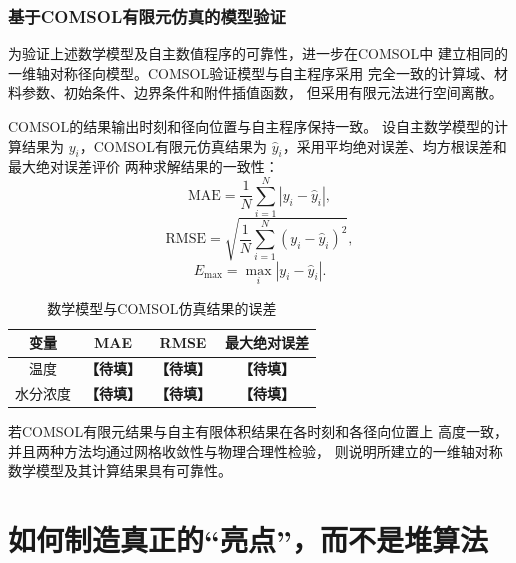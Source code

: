 \documentclass[12pt,a4paper]{article}
\begin{document}
\subsubsection{基于COMSOL有限元仿真的模型验证}

为验证上述数学模型及自主数值程序的可靠性，进一步在COMSOL中
建立相同的一维轴对称径向模型。COMSOL验证模型与自主程序采用
完全一致的计算域、材料参数、初始条件、边界条件和附件插值函数，
但采用有限元法进行空间离散。

COMSOL的结果输出时刻和径向位置与自主程序保持一致。
设自主数学模型的计算结果为 $y_i$，COMSOL有限元仿真结果为
$\hat y_i$，采用平均绝对误差、均方根误差和最大绝对误差评价
两种求解结果的一致性：
\begin{equation}
\mathrm{MAE}
=
\frac{1}{N}
\sum_{i=1}^{N}
\left|y_i-\hat y_i\right|,
\end{equation}
\begin{equation}
\mathrm{RMSE}
=
\sqrt{
\frac{1}{N}
\sum_{i=1}^{N}
\left(y_i-\hat y_i\right)^2
},
\end{equation}
\begin{equation}
E_{\max}
=
\max_i
\left|y_i-\hat y_i\right|.
\end{equation}

\begin{table}[H]
\centering
\caption{数学模型与COMSOL仿真结果的误差}
\label{tab:q1-comsol-validation}
\begin{tabular}{cccc}
\toprule
变量 & MAE & RMSE & 最大绝对误差\\
\midrule
温度 & \textbf{【待填】} & \textbf{【待填】} & \textbf{【待填】}\\
水分浓度 & \textbf{【待填】} & \textbf{【待填】} & \textbf{【待填】}\\
\bottomrule
\end{tabular}
\end{table}

若COMSOL有限元结果与自主有限体积结果在各时刻和各径向位置上
高度一致，并且两种方法均通过网格收敛性与物理合理性检验，
则说明所建立的一维轴对称数学模型及其计算结果具有可靠性。

\section{如何制造真正的“亮点”，而不是堆算法}
\end{document}
